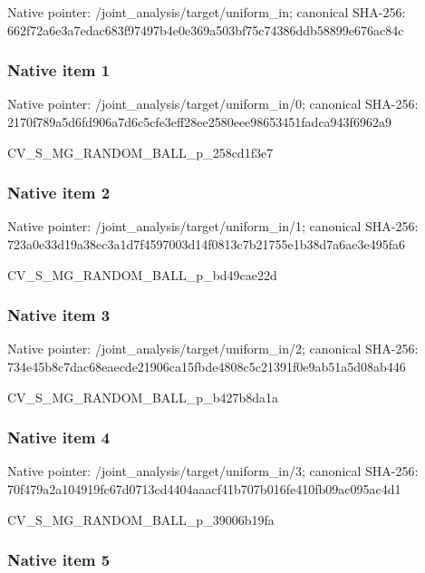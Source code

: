 \documentclass[10pt,a4paper]{article}
\begin{document}
Native pointer: /joint\_analysis/target/uniform\_in; canonical SHA-256: 662f72a6e3a7edac683f9749\allowbreak{}7b4e0e369a503bf75c74386d\allowbreak{}db58899e676ac84c



\subsubsection{Native item 1}


Native pointer: /joint\_analysis/target/uniform\_in/0; canonical SHA-256: 2170f789a5d6fd906a7d6c5c\allowbreak{}fe3eff28ee2580eee9865345\allowbreak{}1fadca943f6962a9


CV\_S\_MG\_RANDOM\_BALL\_p\_258cd1f3e7


\subsubsection{Native item 2}


Native pointer: /joint\_analysis/target/uniform\_in/1; canonical SHA-256: 723a0e33d19a38ec3a1d7f45\allowbreak{}97003d14f0813c7b21755e1b\allowbreak{}38d7a6ae3e495fa6


CV\_S\_MG\_RANDOM\_BALL\_p\_bd49cae22d


\subsubsection{Native item 3}


Native pointer: /joint\_analysis/target/uniform\_in/2; canonical SHA-256: 734e45b8c7dac68eaecde219\allowbreak{}06ca15fbde4808c5c21391f0\allowbreak{}e9ab51a5d08ab446


CV\_S\_MG\_RANDOM\_BALL\_p\_b427b8da1a


\subsubsection{Native item 4}


Native pointer: /joint\_analysis/target/uniform\_in/3; canonical SHA-256: 70f479a2a104919fc67d0713\allowbreak{}cd4404aaacf41b707b016fe4\allowbreak{}10fb09ac095ac4d1


CV\_S\_MG\_RANDOM\_BALL\_p\_39006b19fa


\subsubsection{Native item 5}
\end{document}
